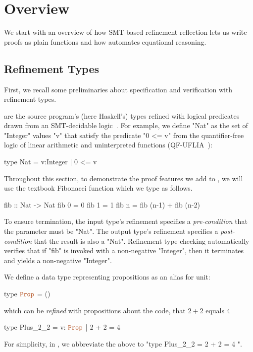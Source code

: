 \section{Overview}
\label{sec:overview}
\label{sec:examples}


We start with an overview of how SMT-based refinement
reflection lets us write proofs as plain
functions and how \pbesym automates equational reasoning.

\subsection{Refinement Types}\label{subsection:overview:refinements}

First, we recall some preliminaries about specification
and verification with refinement types.

 are the source program's (here
Haskell's) types refined with logical predicates drawn
from an SMT-decidable logic~\citep{ConstableS87,Rushby98}.
%
For example, we define "Nat" as the set of "Integer" values
"v" that satisfy the predicate "0 <= v" from
the quantifier-free logic of linear arithmetic and
uninterpreted functions (QF-UFLIA~\cite{SMTLIB2}):
%
\begin{mcode}
    type Nat = { v:Integer | 0 <= v }
\end{mcode}

%
Throughout this section,
to demonstrate the proof features we add to \toolname,
we will use the textbook Fibonacci function which we type as follows.
%
\begin{mcode}
    fib :: Nat -> Nat
    fib 0 = 0
    fib 1 = 1
    fib n = fib (n-1) + fib (n-2)
\end{mcode}
%
To ensure termination, the input type's
refinement specifies a \emph{pre-condition}
that the parameter must be "Nat".
The output type's refinement specifies
a \emph{post-condition} that the result
is also a "Nat".
%
Refinement type checking automatically
verifies that if "fib" is invoked with
a non-negative "Integer", then it terminates
and yields a non-negative "Integer".

%
We define a data type representing propositions
as an alias for unit:
%
\begin{mcode}
    type $\typp$ = ()
\end{mcode}
%
%
which can be \emph{refined} with propositions about
the code, \eg that $2 + 2$ equals $4$
%
\begin{mcode}
    type Plus_2_2 = { v: $\typp$ | 2 + 2 = 4 }
\end{mcode}
%
For simplicity, in \toolname, we abbreviate the above
to "type Plus_2_2 = { 2 + 2 = 4 }".

